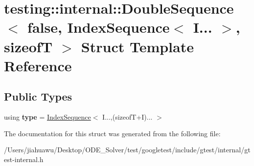 \hypertarget{structtesting_1_1internal_1_1_double_sequence_3_01false_00_01_index_sequence_3_01_i_8_8_8_01_4_00_01sizeof_t_01_4}{}\section{testing\+:\+:internal\+:\+:Double\+Sequence$<$ false, Index\+Sequence$<$ I... $>$, sizeofT $>$ Struct Template Reference}
\label{structtesting_1_1internal_1_1_double_sequence_3_01false_00_01_index_sequence_3_01_i_8_8_8_01_4_00_01sizeof_t_01_4}
\subsection*{Public Types}
\begin{DoxyCompactItemize}
\item 
\mbox{\label{structtesting_1_1internal_1_1_double_sequence_3_01false_00_01_index_sequence_3_01_i_8_8_8_01_4_00_01sizeof_t_01_4_af11568320fe19e984e2eb5ab9ad026aa}} 
using {\bfseries type} = \mbox{\hyperlink{structtesting_1_1internal_1_1_index_sequence}{Index\+Sequence}}$<$ I...,(sizeofT+I)... $>$
\end{DoxyCompactItemize}


The documentation for this struct was generated from the following file\+:\begin{DoxyCompactItemize}
\item 
/\+Users/jiahuawu/\+Desktop/\+O\+D\+E\+\_\+\+Solver/test/googletest/include/gtest/internal/gtest-\/internal.\+h\end{DoxyCompactItemize}
